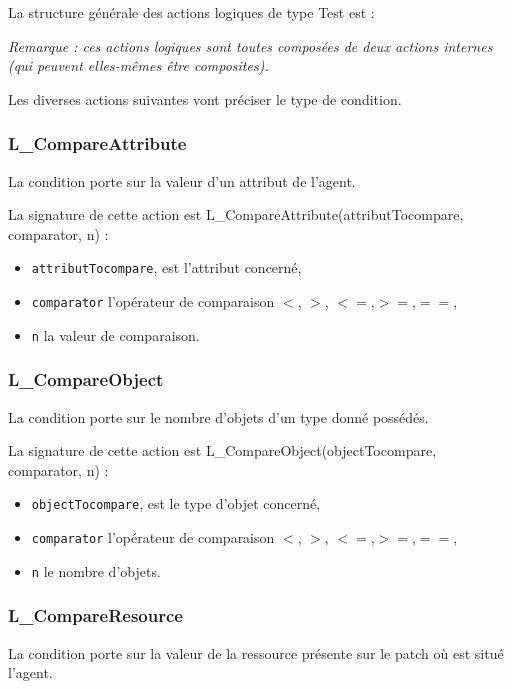 

La structure générale des actions logiques de type Test est :

\begin{algorithm}
  
\end{algorithm}

\newpage
\textit{Remarque : ces actions logiques sont toutes composées de deux actions internes (qui peuvent elles-mêmes être composites).}

Les diverses actions suivantes vont préciser le type de condition.

\subsubsection{L\_CompareAttribute}
La condition porte sur la valeur d'un attribut de l'agent.

La signature de cette action est L\_CompareAttribute(attributTocompare, comparator, n) :
\begin{itemize}
	\item \texttt{attributTocompare}, est l'attribut concerné,
	\item \texttt{comparator} l'opérateur de comparaison $<$, $>$, $<=$,$ >=$,$ ==$,
	\item \texttt{n} la valeur de comparaison.
	\end{itemize}

\subsubsection{L\_CompareObject}
La condition porte sur le nombre d'objets d'un type donné possédés.

La signature de cette action est L\_CompareObject(objectTocompare, comparator, n) :
\begin{itemize}
	\item \texttt{objectTocompare}, est le type d'objet concerné,
	\item \texttt{comparator} l'opérateur de comparaison $<$, $>$, $<=$,$ >=$,$ ==$,
	\item \texttt{n} le nombre d'objets.
	\end{itemize}
\subsubsection{L\_CompareResource}
La condition porte sur la valeur de la ressource présente sur le patch où est situé  l'agent.

